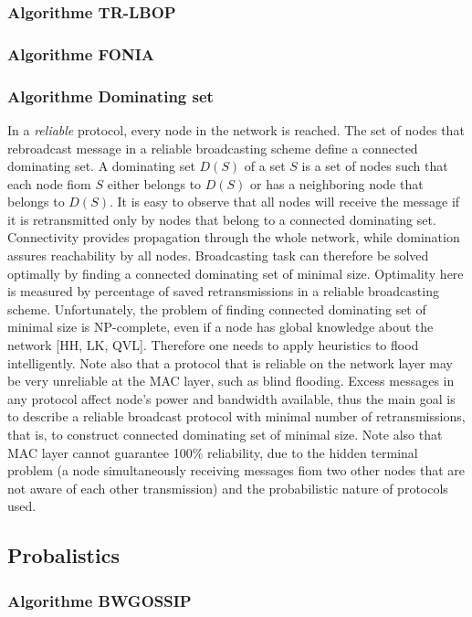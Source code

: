 \subsubsection{Algorithme TR-LBOP}
\cite{Ingelrest2004}
\subsubsection{Algorithme FONIA}

\subsubsection{Algorithme Dominating set}
In a {\it reliable} protocol, every node in the network is reached. The set of nodes that rebroadcast message in a reliable broadcasting scheme 
define a connected dominating set. A dominating set $D(S)$ of a set $S$ is a set of nodes such that each node fiom $S$ either belongs to $D(S)$ or has a neighboring node that belongs to $D(S)$. It is easy to observe that all
 nodes will receive the message if it is retransmitted only by nodes that belong to a connected dominating set. Connectivity provides propagation through the whole network, while domination assures reachability by all nodes.
 Broadcasting task can therefore be solved optimally by finding a connected dominating set of minimal size. Optimality here is measured by percentage of saved retransmissions in a reliable broadcasting scheme. Unfortunately,
 the problem of finding connected dominating set of minimal size is NP-complete, even if a node has global knowledge about the network [HH, LK, QVL]. Therefore one needs to apply heuristics to flood intelligently. Note also
 that a protocol that is reliable on the network layer may be very unreliable at the MAC layer, such as blind flooding. Excess messages in any protocol affect node's power and bandwidth available, thus the main goal is to
 describe a reliable broadcast protocol with minimal number of retransmissions, that is, to construct connected dominating set of minimal size. Note also that MAC layer cannot guarantee 100\% reliability, due to the hidden
 terminal problem (a node simultaneously receiving messages fiom two other nodes that are not aware of each other transmission) and the probabilistic nature of protocols used.

\subsection{Probalistics}


\subsubsection{Algorithme BWGOSSIP}
\cite{lutzeler2011}
